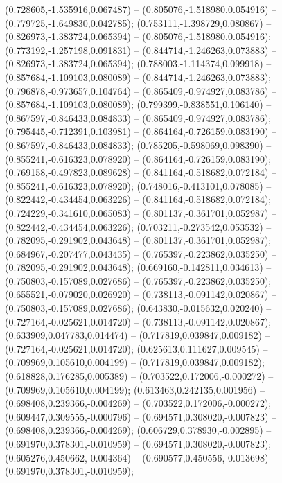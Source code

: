  (0.728605,-1.535916,0.067487) -- (0.805076,-1.518980,0.054916) -- (0.779725,-1.649830,0.042785);
 (0.753111,-1.398729,0.080867) -- (0.826973,-1.383724,0.065394) -- (0.805076,-1.518980,0.054916);
 (0.773192,-1.257198,0.091831) -- (0.844714,-1.246263,0.073883) -- (0.826973,-1.383724,0.065394);
 (0.788003,-1.114374,0.099918) -- (0.857684,-1.109103,0.080089) -- (0.844714,-1.246263,0.073883);
 (0.796878,-0.973657,0.104764) -- (0.865409,-0.974927,0.083786) -- (0.857684,-1.109103,0.080089);
 (0.799399,-0.838551,0.106140) -- (0.867597,-0.846433,0.084833) -- (0.865409,-0.974927,0.083786);
 (0.795445,-0.712391,0.103981) -- (0.864164,-0.726159,0.083190) -- (0.867597,-0.846433,0.084833);
 (0.785205,-0.598069,0.098390) -- (0.855241,-0.616323,0.078920) -- (0.864164,-0.726159,0.083190);
 (0.769158,-0.497823,0.089628) -- (0.841164,-0.518682,0.072184) -- (0.855241,-0.616323,0.078920);
 (0.748016,-0.413101,0.078085) -- (0.822442,-0.434454,0.063226) -- (0.841164,-0.518682,0.072184);
 (0.724229,-0.341610,0.065083) -- (0.801137,-0.361701,0.052987) -- (0.822442,-0.434454,0.063226);
 (0.703211,-0.273542,0.053532) -- (0.782095,-0.291902,0.043648) -- (0.801137,-0.361701,0.052987);
 (0.684967,-0.207477,0.043435) -- (0.765397,-0.223862,0.035250) -- (0.782095,-0.291902,0.043648);
 (0.669160,-0.142811,0.034613) -- (0.750803,-0.157089,0.027686) -- (0.765397,-0.223862,0.035250);
 (0.655521,-0.079020,0.026920) -- (0.738113,-0.091142,0.020867) -- (0.750803,-0.157089,0.027686);
 (0.643830,-0.015632,0.020240) -- (0.727164,-0.025621,0.014720) -- (0.738113,-0.091142,0.020867);
 (0.633909,0.047783,0.014474) -- (0.717819,0.039847,0.009182) -- (0.727164,-0.025621,0.014720);
 (0.625613,0.111627,0.009545) -- (0.709969,0.105610,0.004199) -- (0.717819,0.039847,0.009182);
 (0.618828,0.176285,0.005389) -- (0.703522,0.172006,-0.000272) -- (0.709969,0.105610,0.004199);
 (0.613463,0.242135,0.001956) -- (0.698408,0.239366,-0.004269) -- (0.703522,0.172006,-0.000272);
 (0.609447,0.309555,-0.000796) -- (0.694571,0.308020,-0.007823) -- (0.698408,0.239366,-0.004269);
 (0.606729,0.378930,-0.002895) -- (0.691970,0.378301,-0.010959) -- (0.694571,0.308020,-0.007823);
 (0.605276,0.450662,-0.004364) -- (0.690577,0.450556,-0.013698) -- (0.691970,0.378301,-0.010959);
